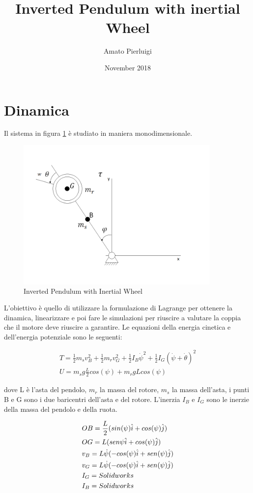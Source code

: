 \documentclass{article}
\title{Inverted Pendulum with inertial Wheel }
\author{Amato Pierluigi}
\date{November 2018}
\begin{document}
\maketitle

\section{Dinamica}
Il sistema in figura \ref{fig:InvertedPendulum} è studiato in maniera monodimensionale.

\begin{figure}[htp]
\centering
\includegraphics[width=10cm]{img/Pendolo.png}
\caption{Inverted Pendulum with Inertial Wheel}
\label{fig:InvertedPendulum}
\end{figure}

L'obiettivo è quello di utilizzare la formulazione di Lagrange per ottenere la dinamica, linearizzare e poi fare le simulazioni per riuscire a valutare la coppia che il motore deve riuscire a garantire.
Le equazioni della energia cinetica e dell'energia potenziale sono le seguenti:

\begin{gather}
T = \frac{1}{2}m_sv_B^2+\frac{1}{2}m_rv_G^2+\frac{1}{2}I_B\dot{\psi}^2+\frac{1}{2}I_G(\dot{\psi}+\dot{\theta})^2 \\
U = m_sg\frac{L}{2}cos(\psi)+m_rgLcos(\psi)
\end{gather}

dove L è l'asta del pendolo, $m_r$ la massa del rotore, $m_s$ la massa dell'asta, i punti B e G sono i due baricentri dell'asta e del rotore.
L'inerzia  $I_B$ e $I_G$ sono le inerzie della massa del pendolo e della ruota.

\begin{align*}
&OB = \frac{L}{2}(sin(\psi)\hat{i}+cos(\psi)\hat{j})\notag\\
&OG = L(sen\psi\hat{i}+cos(\psi)\hat{j})\notag\\
&v_B = L\dot{\psi}(-cos(\psi)\hat{i}+sen(\psi)\hat{j})\notag\\
&v_G = L\dot{\psi}(-cos(\psi)\hat{i}+sen(\psi)\hat{j})\notag\\
&I_G = Solidworks\\
&I_B = Solidworks
\end{align*}
\end{document}
